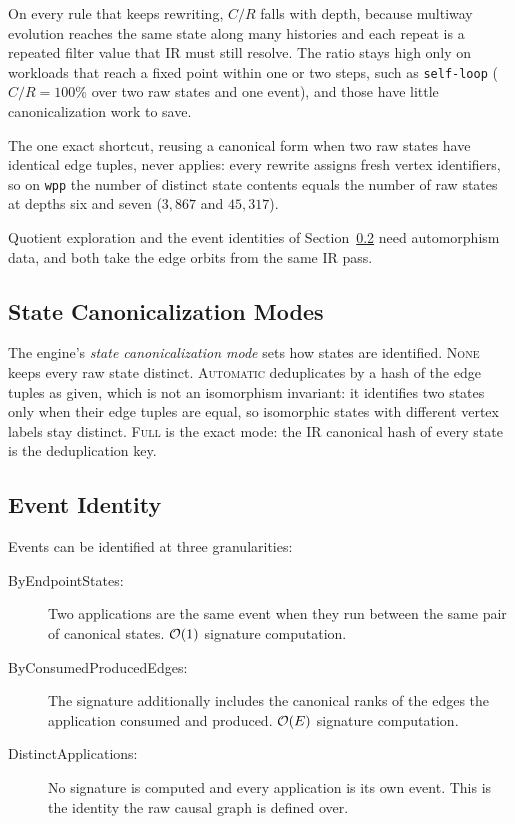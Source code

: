 \noindent On every rule that keeps rewriting, $C/R$ falls with depth, because multiway evolution reaches the same state along many histories and each repeat is a repeated filter value that IR must still resolve. The ratio stays high only on workloads that reach a fixed point within one or two steps, such as \texttt{self-loop} ($C/R = 100\%$ over two raw states and one event), and those have little canonicalization work to save.

The one exact shortcut, reusing a canonical form when two raw states have identical edge tuples, never applies: every rewrite assigns fresh vertex identifiers, so on \texttt{wpp} the number of distinct state contents equals the number of raw states at depths six and seven ($3{,}867$ and $45{,}317$).

Quotient exploration and the event identities of Section~\ref{sec:event-canon} need automorphism data, and both take the edge orbits from the same IR pass.

\subsection{State Canonicalization Modes}

The engine's \emph{state canonicalization mode} sets how states are identified. \textsc{None} keeps every raw state distinct. \textsc{Automatic} deduplicates by a hash of the edge tuples as given, which is not an isomorphism invariant: it identifies two states only when their edge tuples are equal, so isomorphic states with different vertex labels stay distinct. \textsc{Full} is the exact mode: the IR canonical hash of every state is the deduplication key.

\subsection{Event Identity}
\label{sec:event-canon}

Events can be identified at three granularities:

\begin{description}
\item[ByEndpointStates:] Two applications are the same event when they run between the same pair of canonical states. $\mathcal{O}(1)$ signature computation.

\item[ByConsumedProducedEdges:] The signature additionally includes the canonical ranks of the edges the application consumed and produced. $\mathcal{O}(E)$ signature computation.

\item[DistinctApplications:] No signature is computed and every application is its own event. This is the identity the raw causal graph is defined over.
\end{description}

